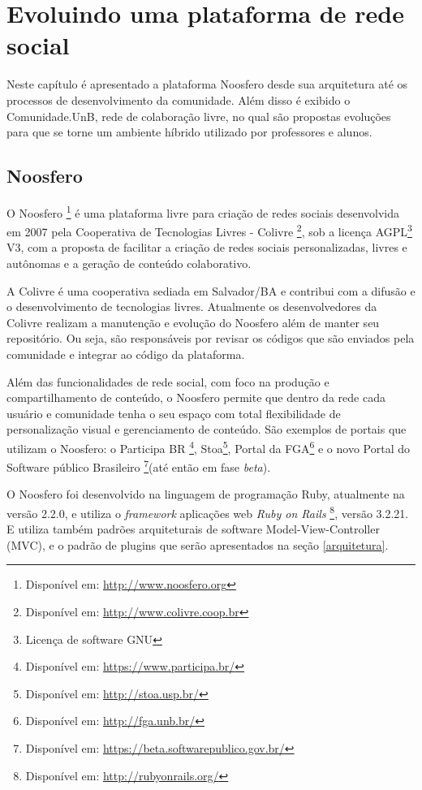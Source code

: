 \chapter{Evoluindo uma plataforma de rede social}
\label{evol-rede-social}

Neste capítulo é apresentado a plataforma Noosfero desde sua arquitetura até os processos de desenvolvimento da comunidade. Além disso é exibido o Comunidade.UnB, rede de colaboração livre, no qual são propostas evoluções para que se torne um ambiente híbrido utilizado por professores e alunos.

\section{Noosfero}
\label{noosfero}

O Noosfero \footnote{Disponível em: \url{http://www.noosfero.org}} é uma plataforma livre para criação de redes sociais desenvolvida em 2007 pela Cooperativa de Tecnologias Livres - Colivre \footnote{Disponível em: \url{http://www.colivre.coop.br}}, sob a licença AGPL\footnote{Licença de software GNU} V3, com a proposta de facilitar a criação de redes sociais personalizadas, livres e autônomas e a geração de conteúdo colaborativo.

A Colivre é uma cooperativa sediada em Salvador/BA e contribui com a difusão e o desenvolvimento de tecnologias livres. Atualmente os desenvolvedores da Colivre realizam a manutenção e evolução do Noosfero além de manter seu repositório. Ou seja, são responsáveis por revisar os códigos que são enviados pela comunidade e integrar ao código da plataforma.

Além das funcionalidades de rede social, com foco na produção e compartilhamento de conteúdo, o Noosfero permite que dentro da rede cada usuário e comunidade tenha o seu espaço com total flexibilidade de personalização visual e gerenciamento de conteúdo. São exemplos de portais que utilizam o Noosfero: o Participa BR \footnote{Disponível em: \url{https://www.participa.br/}}, Stoa\footnote{Disponível em: \url{http://stoa.usp.br/}}, Portal da FGA\footnote{Disponível em: \url{http://fga.unb.br/}} e o novo Portal do Software público Brasileiro \footnote{Disponível em: \url{https://beta.softwarepublico.gov.br/}}(até então em fase \textit{beta}).

O Noosfero foi desenvolvido na linguagem de programação Ruby, atualmente na versão 2.2.0, e utiliza o \textit{framework} aplicações web \textit{Ruby on Rails} \footnote{Disponível em: \url{http://rubyonrails.org/}}, versão 3.2.21. E utiliza também padrões arquiteturais de software Model-View-Controller (MVC), e o padrão de plugins que serão apresentados na seção \ref{arquitetura}.

